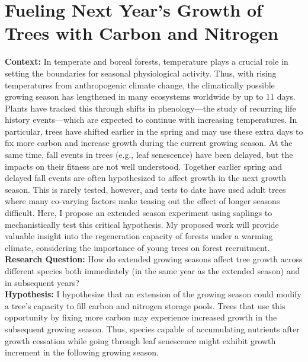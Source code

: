 \documentclass[12pt]{article}
\begin{document}
\section*{Fueling Next Year's Growth of Trees with Carbon and Nitrogen}
\textbf {Context:} %
In temperate and boreal forests, temperature plays a crucial role in setting the boundaries for seasonal physiological activity. Thus, with rising temperatures from anthropogenic climate change, the climatically possible growing season has lengthened in many ecosystems worldwide by up to 11 days.\citep{korner_phenology_2010, menzel_growing_1999} Plants have tracked this through shifts in phenology—the study of recurring life history events—which are expected to continue with increasing temperatures.\citep{wolkovich_warming_2012} In particular, trees have shifted earlier in the spring and may use these extra days to fix more carbon and increase growth during the current growing season.\citep{keenan_net_2014, wang_interactive_2020} At the same time, fall events in trees (e.g., leaf senescence) have been delayed, but the impacts on their fitness are not well understood. Together earlier spring and delayed fall events are often hypothesized to affect growth in the next growth season. This is rarely tested, however, and tests to date have used adult trees where many co-varying factors make teasing out the effect of longer seasons difficult. Here, I propose an extended season experiment using saplings to mechanistically test this critical hypothesis. My proposed work will provide valuable insight into the regeneration capacity of forests under a warming climate, considering the importance of young trees on forest recruitment.\citep{zohner_how_2021} \\
\textbf {Research Question:} How do extended growing seasons affect tree growth across different species both immediately (in the same year as the extended season) and in subsequent years? \\
\textbf {Hypothesis:} I hypothesize that an extension of the growing season could modify a tree’s capacity to fill carbon and nitrogen storage pools.\citep{chapin_ecology_1990, lawrence_variable_2018} Trees that use this opportunity by fixing more carbon may experience increased growth in the subsequent growing season.\citep{landhausser_partitioning_2012, martens_first-year_2007} Thus, species capable of accumulating nutrients after growth cessation while going through leaf senescence might exhibit growth increment in the following growing season.\citep{schott_premature_2013} \\
\end{document}
